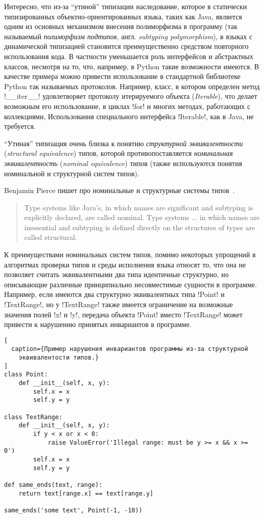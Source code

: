Интересно, что из-за ``утиной'' типизации наследование, которое в статически
типизированных объектно-ориентированных языка, таких как Java, является
одним из основных механизмом внесения полиморфизма в программу (так называемый
\emph{полиморфизм подтипов}, англ. \emph{subtyping polymorphism}),
в языках с динамической типизацией становится преимущественно средством
повторного использования кода. В частности уменьшается роль интерфейсов и
абстрактных классов, несмотря на то, что, например, в Python такие возможности
имеются. В качестве примера можно привести использование в
стандартной библиотеке Python так называемых протоколов. Например, класс, в
котором определен метод !__iter__! удовлетворяет протоколу
итерируемого объекта (\emph{Iterable}), что делает возможным его использование,
в циклах !for! и многих методах, работающих с коллекциями, 
Использования специального интерфейса !Iterable!, как в Java, не требуется.

``Утиная'' типизация очень близка к понятию \emph{структурной эквивалентности}
(\emph{structural equivalence}) типов, которой противопоставляется \emph{номинальная
эквивалентность} (\emph{nominal equivalence}) типов (также используются понятия
номинальной и структурной систем типов).

Benjamin Pierce пишет про номинальные и структурные системы типов~\cite{Pierce2002}.

\begin{quote}
Type systems like Java’s, in which names are significant and subtyping is
explicitly declared, are called nominal. Type systems ... in which names are
inessential and subtyping is defined directly on the structures of types are
called structural.
\end{quote}

К преимуществами номинальных систем типов, помимо некоторых упрощений в
алгоритмах проверки типов и среды исполнения языка относят то,
что она не позволяет считать эквивалентными два типа идентичные структурно, но
описывающие различные принципиально несовместимые сущности в программе.
Например, если имеются два структурно эквивалентных типа !Point! и
!TextRange!, но у !TextRange! также имеется ограничение на
возможные значения полей !x! и !y!, передача объекта !Point! вместо
!TextRange! может привести к нарушению принятых инвариантов в программе.

\begin{lstlisting}[
  caption={Пример нарушения инвариантов программы из-за структурной
    эквивалентости типов.}
]
class Point:
    def __init__(self, x, y):
        self.x = x
        self.y = y

class TextRange:
    def __init__(self, x, y):
        if y < x or x < 0:
            raise ValueError('Illegal range: must be y >= x && x >= 0')
        self.x = x
        self.y = y
        
def same_ends(text, range):
    return text[range.x] == text[range.y]

same_ends('some text', Point(-1, -10))
\end{lstlisting}


